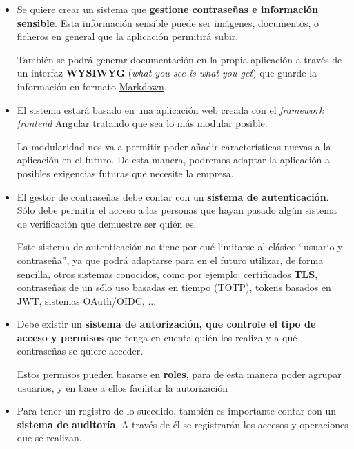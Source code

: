 \documentclass{\ClassPath/viu-tfm-template}
\begin{document}
\begin{itemize}

    \item Se quiere crear un sistema que \textbf{gestione contraseñas e información sensible}. Esta información sensible puede ser imágenes, documentos, o ficheros en general que la aplicación permitirá subir.

    También se podrá generar documentación en la propia aplicación a través de un interfaz \textbf{WYSIWYG} (\textit{what you see is what you get}) que guarde la información en formato \href{https://es.wikipedia.org/wiki/Markdown}{Markdown}.

    \item El sistema estará basado en una aplicación web creada con el \textit{framework frontend} \href{https://angular.io/}{Angular} tratando que sea lo más modular posible.

    La modularidad nos va a permitir poder añadir características nuevas a la aplicación en el futuro. De esta manera, podremos adaptar la aplicación a posibles exigencias futuras que necesite la empresa.

    \item El gestor de contraseñas debe contar con un \textbf{sistema de autenticación}. Sólo debe permitir el acceso a las personas que hayan pasado algún sistema de verificación que demuestre ser quién es.

    Este sistema de autenticación no tiene por qué limitarse al clásico “usuario y contraseña”, ya que podrá adaptarse para en el futuro utilizar, de forma sencilla, otros sistemas conocidos, como por ejemplo: certificados \textbf{TLS}, contraseñas de un sólo uso basadas en tiempo (TOTP), tokens basados en \href{https://en.wikipedia.org/wiki/JSON_Web_Token}{JWT}, sistemas \href{https://en.wikipedia.org/wiki/OAuth}{OAuth}/\href{https://en.wikipedia.org/wiki/OpenID#OpenID_Connect_(OIDC)}{OIDC}, ...

    \item Debe existir un \textbf{sistema de autorización, que controle el tipo de acceso y permisos} que tenga en cuenta quién los realiza y a qué contraseñas se quiere acceder.

    Estos permisos pueden basarse en \textbf{roles}, para de esta manera poder agrupar usuarios, y en base a ellos facilitar la autorización

    \item Para tener un registro de lo sucedido, también es importante contar con un \textbf{sistema de auditoría}. A través de él se registrarán los accesos y operaciones que se realizan.


\end{itemize}
\end{document}
